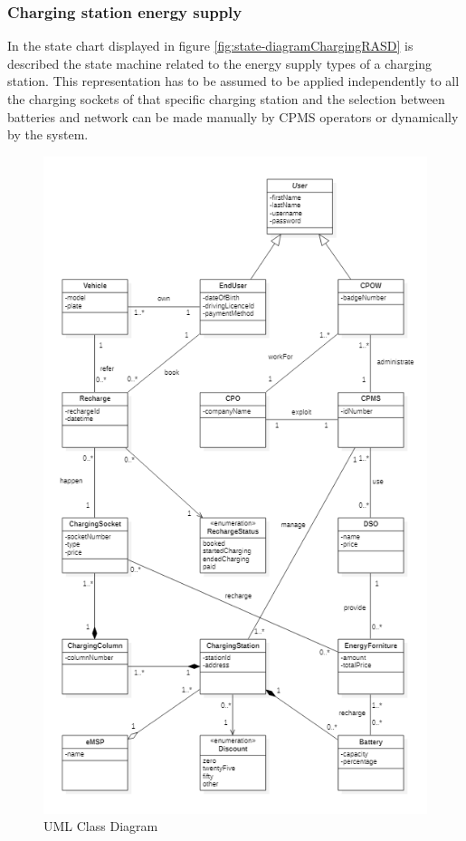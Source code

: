 \documentclass[a4paper]{report}
\begin{document}
\subsubsection{Charging station energy supply}
In the state chart displayed in figure \ref{fig:state-diagramChargingRASD} is described the state machine related to the energy supply types of a charging station. This representation has to be assumed to be applied independently to all the charging sockets of that specific charging station and the selection between batteries and network can be made manually by CPMS operators or dynamically by the system.

\begin{figure}[p]
\includegraphics[width=\textwidth]{ClassDiagramRASDV2}
\caption{UML Class Diagram}
\label{fig:class-diagramRASD}
\end{figure}
\restoregeometry
\end{document}

